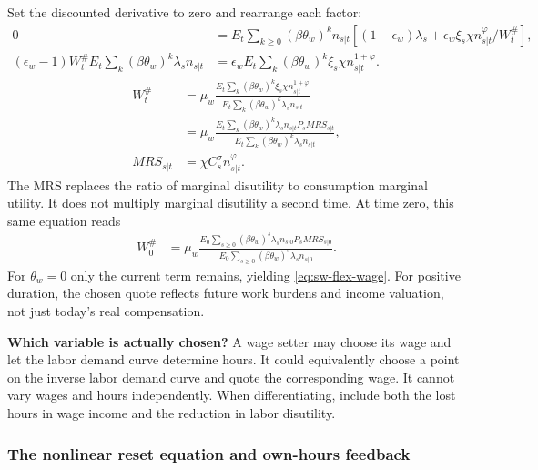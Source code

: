 Set the discounted derivative to zero and rearrange each factor:
\begin{align}
 0&=E_t\sum_{k\geq0}(\beta\theta_w)^k n_{s|t}
       [(1-\epsilon_w)\lambda_s
             +\epsilon_w\xi_s\chi n_{s|t}^{\varphi}/W_t^{\#}],\\
 (\epsilon_w-1)W_t^{\#}E_t\sum_k(\beta\theta_w)^k\lambda_sn_{s|t}
 &=\epsilon_w E_t\sum_k(\beta\theta_w)^k\xi_s\chi n_{s|t}^{1+\varphi}.
\end{align}
\begin{align}
 W_t^{\#}
 &=\mu_w\frac{E_t\sum_k(\beta\theta_w)^k\xi_s\chi n_{s|t}^{1+\varphi}}
                 {E_t\sum_k(\beta\theta_w)^k\lambda_sn_{s|t}}\\
 &=\mu_w\frac{E_t\sum_k(\beta\theta_w)^k\lambda_sn_{s|t}P_sMRS_{s|t}}
                 {E_t\sum_k(\beta\theta_w)^k\lambda_sn_{s|t}},
 \label{eq:sw-reset-ratio}\\
 MRS_{s|t}&=\chi C_s^\sigma n_{s|t}^{\varphi}.
\end{align}
The MRS replaces the ratio of marginal disutility to consumption marginal
utility. It does not multiply marginal disutility a second time. At time zero,
this same equation reads
\begin{align}
 W_0^{\#}
 &=\mu_w\frac{E_0\sum_{s\geq0}(\beta\theta_w)^s
                     \lambda_sn_{s|0}P_sMRS_{s|0}}
                 {E_0\sum_{s\geq0}(\beta\theta_w)^s\lambda_sn_{s|0}}.
\end{align}
For $\theta_w=0$ only the current term remains, yielding
\eqref{eq:sw-flex-wage}. For positive duration, the chosen quote reflects
future work burdens and income valuation, not just today's real compensation.

\begin{redblock}
\textbf{Which variable is actually chosen?}
A wage setter may choose its wage and let the labor demand curve determine
hours. It could equivalently choose a point on the inverse labor demand curve
and quote the corresponding wage. It cannot vary wages and hours independently.
When differentiating, include both the lost hours in wage income and the
reduction in labor disutility.
\end{redblock}

\subsubsection{The nonlinear reset equation and own-hours feedback}

